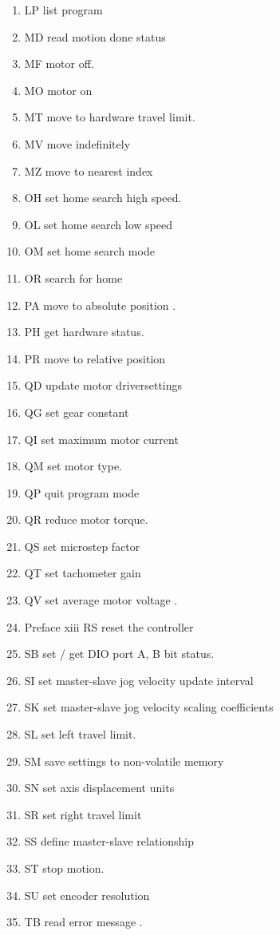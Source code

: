 \documentclass[10pt,letter,twoside]{report}
\begin{document}
\begin{enumerate}
\item LP list program 
\item MD read motion done status 
\item MF motor off. 
\item MO motor on 
\item MT move to hardware travel limit. 
\item MV move indefinitely 
\item MZ move to nearest index  
\item OH set home search high speed. 
\item OL set home search low speed 
\item OM set home search mode 
\item OR search for home 
\item PA move to absolute position . 
\item PH get hardware status. 
\item PR move to relative position 
\item QD update motor driversettings 
\item QG set gear constant 
\item QI set maximum motor current 
\item QM set motor type. 
\item QP quit program mode 
\item QR reduce motor torque. 
\item QS set microstep factor 
\item QT set tachometer gain  
\item QV set average motor voltage . 
\item Preface xiii RS reset the controller 
\item SB set / get DIO port A, B bit status. 
\item SI set master-slave jog velocity update interval 
\item SK set master-slave jog velocity scaling coefficients 
\item SL set left travel limit. 
\item SM save settings to non-volatile memory  
\item SN set axis displacement units 
\item SR set right travel limit 
\item SS define master-slave relationship  
\item ST stop motion. 
\item SU set encoder resolution  
\item TB read error message . 

\end{enumerate}
\end{document}
